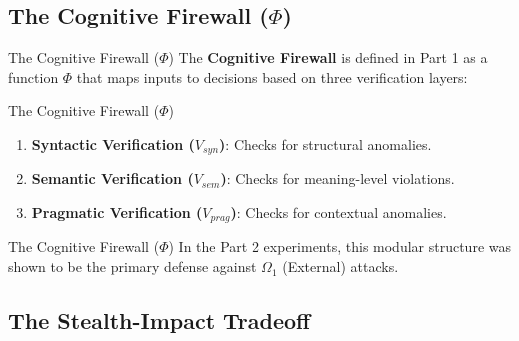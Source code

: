 \documentclass[
  ignorenonframetext,
]{beamer}
\providecommand{\tightlist}{%
  \setlength{\itemsep}{0pt}\setlength{\parskip}{0pt}}
\begin{document}
\subsection{\texorpdfstring{The Cognitive Firewall
(\(\Phi\))}{The Cognitive Firewall (\textbackslash Phi)}}\label{sec:firewall-review}

\begin{frame}[allowframebreaks]{The Cognitive Firewall (\(\Phi\))}
The \textbf{Cognitive Firewall} is defined in Part 1 as a function
\(\Phi\) that maps inputs to decisions based on three verification
layers:

\end{frame}

\begin{frame}[allowframebreaks]{The Cognitive Firewall (\(\Phi\))}
\begin{enumerate}
\tightlist
\item
  \textbf{Syntactic Verification (\(V_{syn}\))}: Checks for structural
  anomalies.
\item
  \textbf{Semantic Verification (\(V_{sem}\))}: Checks for meaning-level
  violations.
\item
  \textbf{Pragmatic Verification (\(V_{prag}\))}: Checks for contextual
  anomalies.
\end{enumerate}

\end{frame}

\begin{frame}[allowframebreaks]{The Cognitive Firewall (\(\Phi\))}
In the Part 2 experiments, this modular structure was shown to be the
primary defense against \(\Omega_1\) (External) attacks.
\end{frame}

\subsection{The Stealth-Impact
Tradeoff}\label{sec:stealth-impact-review}
\end{document}
